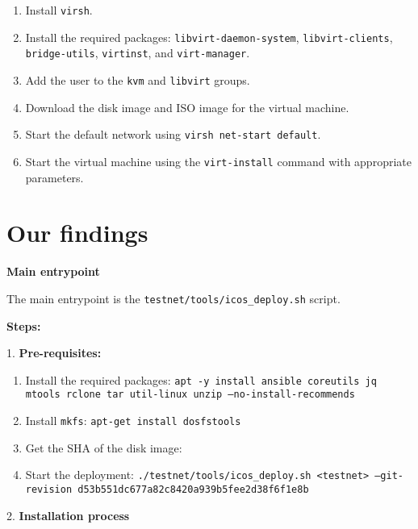 \begin{enumerate}
    \item Install \texttt{virsh}.
    \item Install the required packages: \texttt{libvirt-daemon-system}, \texttt{libvirt-clients}, \texttt{bridge-utils}, \texttt
    {virtinst}, and \texttt{virt-manager}.
    \item Add the user to the \texttt{kvm} and \texttt{libvirt} groups.
    \item Download the disk image and ISO image for the virtual machine.
    \item Start the default network using \texttt{virsh net-start default}.
    \item Start the virtual machine using the \texttt{virt-install} command with appropriate parameters.
\end{enumerate}

\section{Our findings}

\textbf{Main entrypoint}

The main entrypoint is the \texttt{testnet/tools/icos\_deploy.sh} script.

\textbf{Steps:}

1. \textbf{Pre-requisites:}
    \begin{enumerate}
        \item Install the required packages:
        \texttt{apt -y install ansible coreutils jq mtools rclone tar util-linux unzip --no-install-recommends}
        \item Install \texttt{mkfs}:
        \texttt{apt-get install dosfstools}
        \item Get the SHA of the disk image:
        \item Start the deployment:
        \texttt{./testnet/tools/icos\_deploy.sh <testnet> --git-revision d53b551dc677a82c8420a939b5fee2d38f6f1e8b}
    \end{enumerate}

2. \textbf{Installation process}
    
